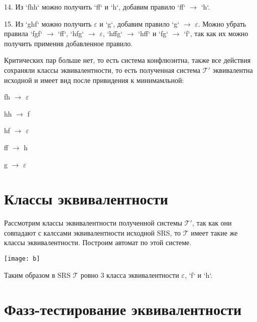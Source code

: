 \documentclass[a4paper, 14pt]{extarticle}
\begin{document}
14. Из `fhh` можно получить `ff` и `h`, добавим правило `ff` $\rightarrow$ `h`. 

15. Из `ghf` можно получить $\varepsilon$ и `g`, добавим правило `g` $\rightarrow$ $\varepsilon$. Можно убрать правила `fgf` $\rightarrow$ `ff`, `hfg` $\rightarrow$ $\varepsilon$, `hffg` $\rightarrow$ `hff` и `fg` $\rightarrow$ `f`, так как их можно получить применив добавленное правило.

Критических пар больше нет, то есть система конфлюэнтна, также все действия сохраняли классы эквивалентности, то есть полученная система $\mathcal{T}'$ эквивалентна исходной и имеет вид после привидения к минимамльной:

fh $\rightarrow$ $\varepsilon$

hh $\rightarrow$ f

hf $\rightarrow$ $\varepsilon$

ff $\rightarrow$ h

g $\rightarrow$ $\varepsilon$

\section{Классы эквивалентности}

Рассмотрим классы эквивалентности полученной системы $\mathcal{T}'$, так как они совпадают с калссами эквивалентности исходной SRS, то $\mathcal{T}$ имеет такие же классы эквивалентности. Построим автомат по этой системе.

\begin{center}
\texttt{[image: b]}
\end{center}

Таким образом в SRS $\mathcal{T}$ ровно 3 класса эквивалентности $\varepsilon$, `f` и `h`.

\section{Фазз-тестирование эквивалентности}
\end{document}
